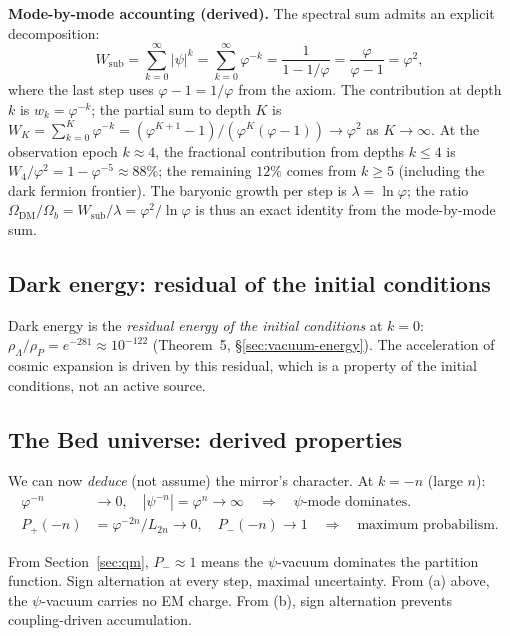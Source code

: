 \documentclass[12pt,a4paper]{article}
\newcommand{\bed}{Bed universe}
\begin{document}
\textbf{Mode-by-mode accounting (derived).}  The spectral sum admits an explicit decomposition:
\begin{equation}
W_{\mathrm{sub}} = \sum_{k=0}^{\infty} |\psi|^k = \sum_{k=0}^{\infty} \varphi^{-k} = \frac{1}{1 - 1/\varphi} = \frac{\varphi}{\varphi - 1} = \varphi^2,
\end{equation}
where the last step uses $\varphi - 1 = 1/\varphi$ from the axiom. The contribution at depth $k$ is $w_k = \varphi^{-k}$; the partial sum to depth $K$ is $W_K = \sum_{k=0}^{K} \varphi^{-k} = (\varphi^{K+1} - 1)/(\varphi^K(\varphi - 1)) \to \varphi^2$ as $K \to \infty$. At the observation epoch $k \approx 4$, the fractional contribution from depths $k \leq 4$ is $W_4/\varphi^2 = 1 - \varphi^{-5} \approx 88\%$; the remaining $12\%$ comes from $k \geq 5$ (including the dark fermion frontier). The baryonic growth per step is $\lambda = \ln\varphi$; the ratio $\Omega_{\mathrm{DM}}/\Omega_b = W_{\mathrm{sub}}/\lambda = \varphi^2/\ln\varphi$ is thus an exact identity from the mode-by-mode sum.

\subsection{Dark energy: residual of the initial conditions}

Dark energy is the \emph{residual energy of the initial conditions} at $k = 0$: $\rho_\Lambda/\rho_P = e^{-281} \approx 10^{-122}$ (Theorem~5, \S\ref{sec:vacuum-energy}).  The acceleration of cosmic expansion is driven by this residual, which is a property of the initial conditions, not an active source.

\subsection{The \bed{}: derived properties}

We can now \emph{deduce} (not assume) the mirror's character. At $k = -n$ (large $n$):
\begin{align}
\varphi^{-n} &\to 0, \quad |\psi^{-n}| = \varphi^n \to \infty \quad \Longrightarrow \quad \text{$\psi$-mode dominates.} \\
P_+(-n) &= \varphi^{-2n}/L_{2n} \to 0, \quad P_-(-n) \to 1 \quad \Longrightarrow \quad \text{maximum probabilism.}
\end{align}

From Section~\ref{sec:qm}, $P_- \approx 1$ means the $\psi$-vacuum dominates the partition function.  Sign alternation at every step, maximal uncertainty.  From (a) above, the $\psi$-vacuum carries no EM charge.  From (b), sign alternation prevents coupling-driven accumulation.
\end{document}
